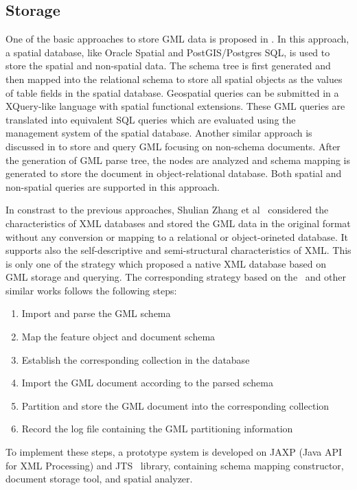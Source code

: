 \documentclass[a4paper,12pt]{article}
\begin{document}
\subsection{Storage}
\label{storage}
One of the basic approaches to store GML data is proposed in \cite{Li2004}. 
In this approach, a spatial database, like Oracle Spatial and PostGIS/Postgres SQL, 
is used to store the spatial and non-spatial data. 
The schema tree is first generated and then mapped into the relational schema to store all spatial objects as 
the values of table fields in the spatial database. Geospatial queries can be submitted 
in a XQuery\cite{xquery}-like language with spatial functional extensions.
These GML queries are translated into equivalent SQL queries which are evaluated 
using the management system of the spatial database.
Another similar approach is discussed in \cite{Zhu2011} to store and query GML 
focusing on non-schema documents. After the generation of GML parse tree, 
the nodes are analyzed and schema mapping is generated to store the document in object-relational database. 
Both spatial and non-spatial queries are supported in this approach.

In constrast to the previous approaches,
Shulian Zhang et al~\cite{Zhang2008} considered the characteristics of XML databases 
and stored the GML data in the original format
without any conversion or mapping to a relational or object-orineted database. 
It supports also the self-descriptive and semi-structural characteristics of XML.
This is only one of the strategy which proposed a native XML database based on GML storage and querying.
The corresponding strategy based on the~\cite{Zhang2008} and other similar works follows the
following steps:
\begin{enumerate}
\item Import and parse the GML schema
\item Map the feature object and document schema
\item Establish the corresponding collection in the database
\item Import the GML document according to the parsed schema
\item Partition and store the GML document into the corresponding collection
\item Record the log file containing the GML partitioning information
\end{enumerate}
To implement these steps, a prototype system is developed on JAXP (Java API for XML Processing) 
and JTS~\cite{jts} library, containing schema mapping constructor, document storage tool, 
and spatial analyzer.
\end{document}

